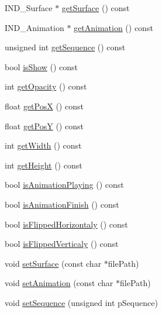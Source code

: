 \begin{DoxyCompactItemize}
\item 
I\-N\-D\-\_\-\-Surface $\ast$ \hyperlink{class_symp_1_1_render_entity_a22980c9774e7e2f9b7664b994a07d98a}{get\-Surface} () const 
\item 
I\-N\-D\-\_\-\-Animation $\ast$ \hyperlink{class_symp_1_1_render_entity_a4aa566eb8d7722b7b655d4b49a54cc68}{get\-Animation} () const 
\item 
unsigned int \hyperlink{class_symp_1_1_render_entity_a352c69cb6974d124ad066d0b7b6c4981}{get\-Sequence} () const 
\item 
bool \hyperlink{class_symp_1_1_render_entity_a7d3eb409d809bf25ee79de81374fbda6}{is\-Show} () const 
\item 
int \hyperlink{class_symp_1_1_render_entity_ae2a81c03c6fffd2ba17ed68e9ed800f1}{get\-Opacity} () const 
\item 
float \hyperlink{class_symp_1_1_render_entity_a9665208c56b63e4c294e099e52a1f93e}{get\-Pos\-X} () const 
\item 
float \hyperlink{class_symp_1_1_render_entity_a379b1ea5104113cba5a1a561fa06570c}{get\-Pos\-Y} () const 
\item 
int \hyperlink{class_symp_1_1_render_entity_a179b72bcc0919c753b76c32c2b9f16af}{get\-Width} () const 
\item 
int \hyperlink{class_symp_1_1_render_entity_a427e9541ade5428f90794eb7380ab761}{get\-Height} () const 
\item 
bool \hyperlink{class_symp_1_1_render_entity_a48ab463295cf1edc65fcf06e46928ba4}{is\-Animation\-Playing} () const 
\item 
bool \hyperlink{class_symp_1_1_render_entity_a58303e3e44a9a4fcf49cb8ba86e684ba}{is\-Animation\-Finish} () const 
\item 
bool \hyperlink{class_symp_1_1_render_entity_abf68a93294e3bf55e298088e829eaf74}{is\-Flipped\-Horizontaly} () const 
\item 
bool \hyperlink{class_symp_1_1_render_entity_ab3677488f3ebdf686b3e7f44db081798}{is\-Flipped\-Verticaly} () const 
\item 
void \hyperlink{class_symp_1_1_render_entity_a5d12b22c3e790569bf98918a7aae91f3}{set\-Surface} (const char $\ast$file\-Path)
\item 
void \hyperlink{class_symp_1_1_render_entity_ac47597dd2ebf97b78ea7696a0e54903f}{set\-Animation} (const char $\ast$file\-Path)
\item 
void \hyperlink{class_symp_1_1_render_entity_a33cf06dfd78275fb847c837ccf4a04a0}{set\-Sequence} (unsigned int p\-Sequence)
\item 

\end{DoxyCompactItemize}
